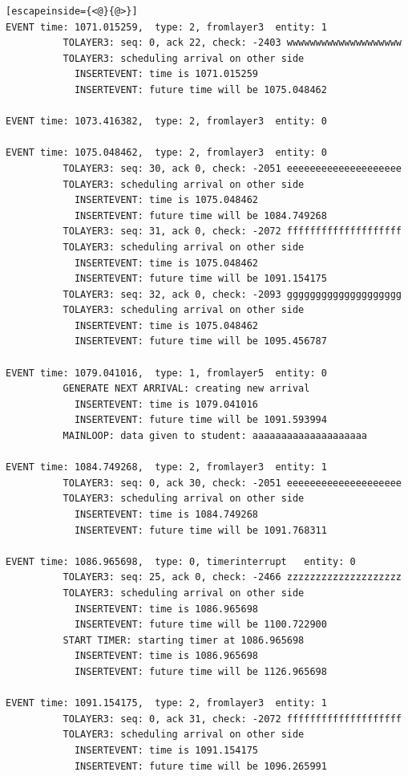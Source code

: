 \documentclass[paper=a4, fontsize=11pt]{scrartcl}
\numberwithin{equation}{section}		%
\numberwithin{figure}{section}			%
\numberwithin{table}{section}				%
\begin{document}
\begin{lstlisting}[escapeinside={<@}{@>}]
EVENT time: 1071.015259,  type: 2, fromlayer3  entity: 1
          TOLAYER3: seq: 0, ack 22, check: -2403 wwwwwwwwwwwwwwwwwwww
          TOLAYER3: scheduling arrival on other side
            INSERTEVENT: time is 1071.015259
            INSERTEVENT: future time will be 1075.048462

EVENT time: 1073.416382,  type: 2, fromlayer3  entity: 0

EVENT time: 1075.048462,  type: 2, fromlayer3  entity: 0
          TOLAYER3: seq: 30, ack 0, check: -2051 eeeeeeeeeeeeeeeeeeee
          TOLAYER3: scheduling arrival on other side
            INSERTEVENT: time is 1075.048462
            INSERTEVENT: future time will be 1084.749268
          TOLAYER3: seq: 31, ack 0, check: -2072 ffffffffffffffffffff
          TOLAYER3: scheduling arrival on other side
            INSERTEVENT: time is 1075.048462
            INSERTEVENT: future time will be 1091.154175
          TOLAYER3: seq: 32, ack 0, check: -2093 gggggggggggggggggggg
          TOLAYER3: scheduling arrival on other side
            INSERTEVENT: time is 1075.048462
            INSERTEVENT: future time will be 1095.456787

EVENT time: 1079.041016,  type: 1, fromlayer5  entity: 0
          GENERATE NEXT ARRIVAL: creating new arrival
            INSERTEVENT: time is 1079.041016
            INSERTEVENT: future time will be 1091.593994
          MAINLOOP: data given to student: aaaaaaaaaaaaaaaaaaaa

EVENT time: 1084.749268,  type: 2, fromlayer3  entity: 1
          TOLAYER3: seq: 0, ack 30, check: -2051 eeeeeeeeeeeeeeeeeeee
          TOLAYER3: scheduling arrival on other side
            INSERTEVENT: time is 1084.749268
            INSERTEVENT: future time will be 1091.768311

EVENT time: 1086.965698,  type: 0, timerinterrupt   entity: 0
          TOLAYER3: seq: 25, ack 0, check: -2466 zzzzzzzzzzzzzzzzzzzz
          TOLAYER3: scheduling arrival on other side
            INSERTEVENT: time is 1086.965698
            INSERTEVENT: future time will be 1100.722900
          START TIMER: starting timer at 1086.965698
            INSERTEVENT: time is 1086.965698
            INSERTEVENT: future time will be 1126.965698

EVENT time: 1091.154175,  type: 2, fromlayer3  entity: 1
          TOLAYER3: seq: 0, ack 31, check: -2072 ffffffffffffffffffff
          TOLAYER3: scheduling arrival on other side
            INSERTEVENT: time is 1091.154175
            INSERTEVENT: future time will be 1096.265991


\end{lstlisting}
\end{document}
